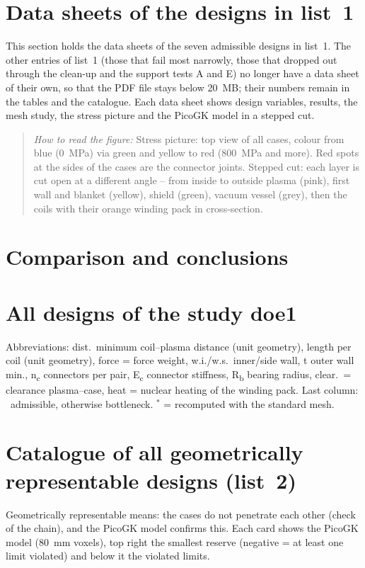 \documentclass[10pt,a4paper]{article}
\newcommand{\lesehilfe}[1]{\begin{quote}\small\textit{How to read the figure:} #1\end{quote}}
\begin{document}
\section{Data sheets of the designs in list~1}\label{sec:steckbriefe}
This section holds the data sheets of the seven admissible designs in list~1. The other entries of list~1 (those that
fail most narrowly, those that dropped out through the clean-up and the support tests A and E) no longer have a data
sheet of their own, so that the PDF file stays below 20~MB; their numbers remain in the tables and the catalogue.
Each data sheet shows design variables, results, the mesh study, the stress picture and
the PicoGK model in a stepped cut.
\lesehilfe{Stress picture: top view of all cases, colour from blue (\SI{0}{MPa}) via green and yellow to red
(\SI{800}{MPa} and more). Red spots at the sides of the cases are the connector joints. Stepped cut: each layer is cut
open at a different angle -- from inside to outside plasma (pink), first wall and blanket (yellow), shield (green),
vacuum vessel (grey), then the coils with their orange winding pack in cross-section.}



\section{Comparison and conclusions}\label{sec:vergleich}


\appendix
\section{All designs of the study doe1}\label{anh:alle}
Abbreviations: dist.\ minimum coil--plasma distance (unit geometry), length per coil (unit geometry), force = force
weight, w.i./w.s.\ inner/side wall, t outer wall min., n\textsubscript{c} connectors per pair, E\textsubscript{c}
connector stiffness, R\textsubscript{b} bearing radius, clear.\ = clearance plasma--case, heat = nuclear heating of the
winding pack. Last column: \checkmark\ admissible, otherwise bottleneck. $^\ast$ = recomputed with the standard mesh.


\section{Catalogue of all geometrically representable designs (list~2)}\label{anh:katalog}
Geometrically representable means: the cases do not penetrate each other (check of the chain), and the PicoGK model
confirms this. Each card shows the PicoGK model (\SI{80}{mm} voxels), top right the smallest reserve (negative = at least
one limit violated) and below it the violated limits.
\clearpage

\end{document}
